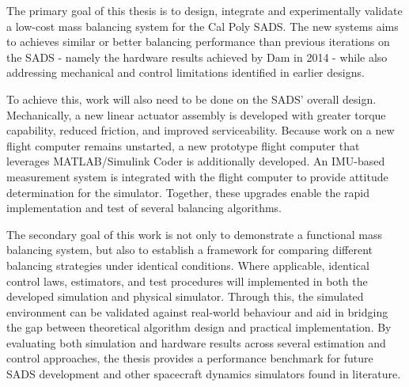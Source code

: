 The primary goal of this thesis is to design, integrate and experimentally validate a low-cost mass balancing system for the Cal Poly SADS. The new systems aims to achieves similar or better balancing performance than previous iterations on the SADS - namely the hardware results achieved by Dam in 2014 - while also addressing mechanical and control limitations identified in earlier designs. 

To achieve this, work will also need to be done on the SADS' overall design. Mechanically, a new linear actuator assembly is developed with greater torque capability, reduced friction, and improved serviceability. Because work on a new flight computer remains unstarted, a new prototype flight computer that leverages MATLAB/Simulink Coder is additionally developed. An IMU-based measurement system is integrated with the flight computer to provide attitude determination for the simulator. Together, these upgrades enable the rapid implementation and test of several balancing algorithms.

The secondary goal of this work is not only to demonstrate a functional mass balancing system, but also to establish a framework for comparing different balancing strategies under identical conditions. Where applicable, identical control laws, estimators, and test procedures will implemented in both the developed simulation and physical simulator. Through this, the simulated environment can be validated against real-world behaviour and aid in bridging the gap between theoretical algorithm design and practical implementation. By evaluating both simulation and hardware results across several estimation and control approaches, the thesis provides a performance benchmark for future SADS development and other spacecraft dynamics simulators found in literature.